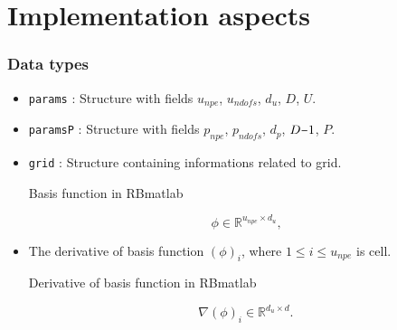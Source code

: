\documentclass{beamer}
\newcommand{\minus}{\scalebox{0.75}[1.0]{$-$}}
\begin{document}
\section{Implementation aspects}


\begin{frame}
\frametitle{Data types}

\begin{itemize}
\item \texttt{params} : Structure with fields $u_{npe}$, $u_{ndofs}$, $d_u$, $D$, $U$.

\item \texttt{paramsP} : Structure with fields $p_{npe}$, $p_{ndofs}$, $d_p$, $D \minus 1$, $P$.

\item \texttt{grid} : Structure containing informations related to grid.

\begin{block}{Basis function in RBmatlab}

\begin{equation}\label{basis_func_velocity_rbmatlab}
\phi \in \mathbb{R}^{u_{npe} \times d_u} \textrm{,}
\end{equation}

\end{block}

\item The derivative of basis function $(\phi)_{i}$, where $1 \leq i \leq u_{npe}$ is cell.

\begin{block}{Derivative of basis function in RBmatlab}

\begin{equation}\label{basis_func_derivative_velocity_rbmatlab}
\nabla (\phi)_{i} \in \mathbb{R}^{{d_u} \times d} \textrm{.}
\end{equation}

\end{block}

\end{itemize}

\end{frame}

\end{document}
